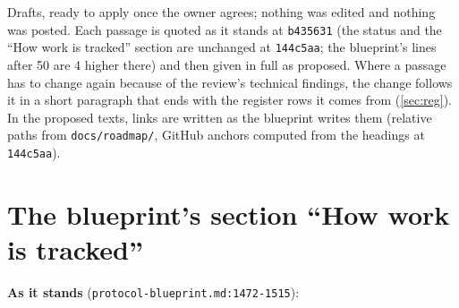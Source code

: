\label{sec:docs-texts}

\begin{sloppypar}
Drafts, ready to apply once the owner agrees; nothing was edited and nothing was posted. Each passage is quoted as it stands at \texttt{b435631} (the status and the ``How work is tracked'' section are unchanged at \texttt{144c5aa}; the blueprint's lines after 50 are 4 higher there) and then given in full as proposed. Where a passage has to change again because of the review's technical findings, the change follows it in a short paragraph that ends with the register rows it comes from (\cref{sec:reg}). In the proposed texts, links are written as the blueprint writes them (relative paths from \texttt{docs/\allowbreak{}roadmap/\allowbreak{}}, GitHub anchors computed from the headings at \texttt{144c5aa}).
\end{sloppypar}

\section{The blueprint's section ``How work is tracked''}\label{sec:docs-text-tracking}

\textbf{As it stands} (\texttt{protocol-\allowbreak{}blueprint.\allowbreak{}md:\allowbreak{}1472-\allowbreak{}1515}):


